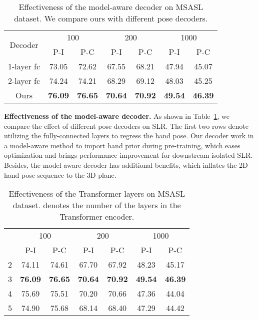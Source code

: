 \documentclass[10pt,twocolumn,letterpaper]{article}
\begin{document}
\begin{table}[t]
\small
\tabcolsep=4pt
\begin{center}
\begin{tabular}{c|cc|cc|cc}
\hline
\multicolumn{1}{c|}{\multirow{2}{*}{Decoder}} & \multicolumn{2}{c|}{100} & \multicolumn{2}{c|}{200} & \multicolumn{2}{c}{1000} \\
           & P-I & P-C & P-I   & P-C   & P-I   & P-C   \\ \hline \hline
1-layer fc & 73.05 & 72.62 & 67.55 & 68.21 & 47.94 & 45.07  \\
2-layer fc & 74.24 & 74.21 & 68.29 & 69.12 & 48.03 & 45.25   \\
Ours       & \textbf{76.09} & \textbf{76.65} & \textbf{70.64} & \textbf{70.92} & \textbf{49.54} & \textbf{46.39} \\ \hline   
\end{tabular}
\end{center}
\caption{Effectiveness of the model-aware decoder on MSASL dataset. We compare ours with different pose decoders.}
\label{model-aware}
\vspace{-0.2cm}
\end{table}




\noindent \textbf{Effectiveness of the model-aware decoder.}
As shown in Table~\ref{model-aware}, we compare the effect of different pose decoders on SLR.
The first two rows denote utilizing the fully-connected layers to regress the hand pose.
Our decoder work in a model-aware method to import hand prior during pre-training, which eases optimization and brings performance improvement for downstream isolated SLR.
Besides, the model-aware decoder has additional benefits, which inflates the 2D hand pose sequence to the 3D plane.


\begin{table}[t]
\small
\tabcolsep=6pt
\begin{center}
\begin{tabular}{c|cc|cc|cc}
\hline
\multicolumn{1}{c|}{\multirow{2}{*}{}} & \multicolumn{2}{c|}{100} & \multicolumn{2}{c|}{200} & \multicolumn{2}{c}{1000} \\
      & P-I & P-C & P-I & P-C & P-I & P-C   \\ \hline \hline
2 & 74.11 & 74.61  & 67.70 & 67.92 & 48.23 & 45.17   \\
3 & \textbf{76.09} & \textbf{76.65} & \textbf{70.64} & \textbf{70.92} & \textbf{49.54} & \textbf{46.39} \\  
4 & 75.69 & 75.51 & 70.20 & 70.66 & 47.36 & 44.04  \\
5 & 74.90 & 75.68 & 68.14 & 68.40 & 47.29 & 44.42  \\ \hline  
\end{tabular}
\end{center}
\caption{Effectiveness of the Transformer layers  on MSASL dataset.  denotes the number of the layers in the Transformer encoder.}
\label{layer}
\vspace{-0.3cm}
\end{table}
\end{document}
